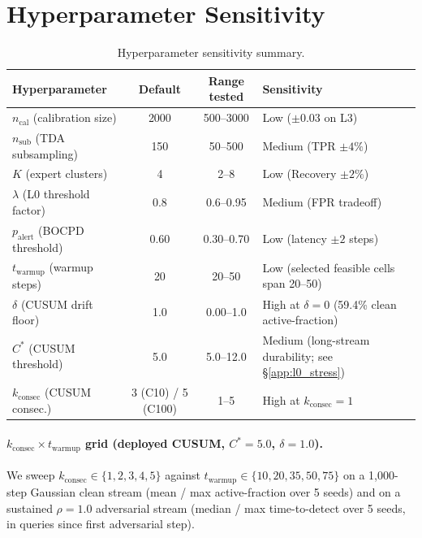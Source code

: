 
\section{Hyperparameter Sensitivity}
\label{app:hyperparams}

\begin{table}[h]
\centering
\small
\begin{tabular}{lccl}
\toprule
Hyperparameter & Default & Range tested & Sensitivity \\
\midrule
$n_\text{cal}$ (calibration size)  & 2000 & 500--3000 & Low ($\pm0.03$ on L3) \\
$n_\text{sub}$ (TDA subsampling)   & 150  & 50--500   & Medium (TPR $\pm4\%$) \\
$K$ (expert clusters)              & 4    & 2--8      & Low (Recovery $\pm2\%$) \\
$\lambda$ (L0 threshold factor)    & 0.8  & 0.6--0.95 & Medium (FPR tradeoff) \\
$p_\text{alert}$ (BOCPD threshold) & 0.60 & 0.30--0.70 & Low (latency $\pm2$ steps) \\
$t_\text{warmup}$ (warmup steps)   & 20   & 20--50    & Low (selected feasible cells span 20--50) \\
$\delta$ (CUSUM drift floor)       & 1.0  & 0.00--1.0 & High at $\delta=0$ (59.4\% clean active-fraction) \\
$C^*$ (CUSUM threshold)            & 5.0  & 5.0--12.0 & Medium (long-stream durability; see \S\ref{app:l0_stress}) \\
$k_\text{consec}$ (CUSUM consec.)  & 3 (C10) / 5 (C100) & 1--5 & High at $k_\text{consec}=1$ \\
\bottomrule
\end{tabular}
\caption{Hyperparameter sensitivity summary.}
\label{tab:hyper}
\end{table}

\paragraph{$k_\text{consec} \times t_\text{warmup}$ grid (deployed CUSUM,
$C^*{=}5.0$, $\delta{=}1.0$).}
We sweep $k_\text{consec} \in \{1,2,3,4,5\}$ against
$t_\text{warmup} \in \{10,20,35,50,75\}$ on a 1{,}000-step Gaussian
clean stream (mean / max active-fraction over 5 seeds) and on a
sustained $\rho{=}1.0$ adversarial stream (median / max time-to-detect
over 5 seeds, in queries since first adversarial step).

